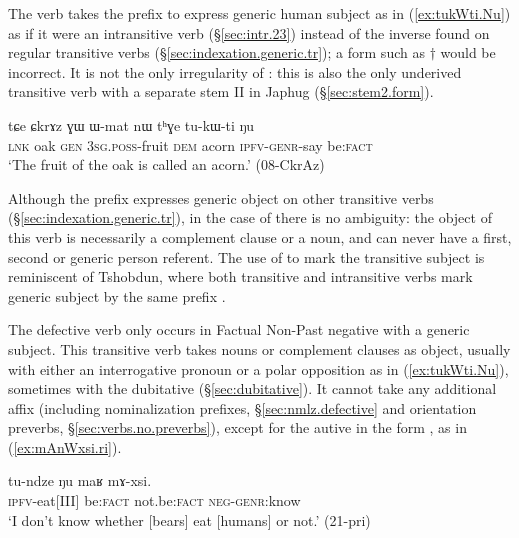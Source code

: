 The verb  takes the prefix  to express generic human subject as in (\ref{ex:tukWti.Nu}) as if it were an intransitive verb (§\ref{sec:intr.23}) instead of the inverse  found on regular transitive verbs (§\ref{sec:indexation.generic.tr}); a form such as $\dagger$ would be incorrect. It is not the only irregularity of  : this is also the only underived transitive verb with a separate stem II in Japhug (§\ref{sec:stem2.form}).


\begin{exe}
\ex   \label{ex:tukWti.Nu}
 \gll   tɕe ɕkrɤz ɣɯ ɯ-mat nɯ tʰɣe tu-kɯ-ti ŋu \\
 \textsc{lnk} oak \textsc{gen} \textsc{3sg}.\textsc{poss}-fruit \textsc{dem} acorn \textsc{ipfv}-\textsc{genr}-say be:\textsc{fact} \\
 \glt `The fruit of the oak is called an acorn.' (08-CkrAz)
\end{exe}

Although the prefix  expresses generic object on other transitive verbs (§\ref{sec:indexation.generic.tr}), in the case of  there is no ambiguity: the object of this verb is necessarily a complement clause or a noun, and can never have a first, second or generic person referent.  The use of  to mark the transitive subject is reminiscent of Tshobdun, where both transitive and intransitive verbs mark generic subject by the same prefix \citep{sun14generic}. 

The defective verb  only occurs in Factual Non-Past negative with a generic subject. This transitive verb takes nouns or complement clauses as object, usually with either an interrogative pronoun or a polar opposition as in (\ref{ex:tukWti.Nu}), sometimes with the dubitative (§\ref{sec:dubitative}). It cannot take any additional affix (including nominalization prefixes, §\ref{sec:nmlz.defective} and orientation preverbs, §\ref{sec:verbs.no.preverbs}), except for the autive  in the form , as in (\ref{ex:mAnWxsi.ri}). 

\begin{exe}
\ex   \label{ex:Nu.maR.mAxsi}
 \gll  tu-ndze ŋu maʁ mɤ-xsi. \\
 \textsc{ipfv}-eat[III] be:\textsc{fact} not.be:\textsc{fact} \textsc{neg}-\textsc{genr}:know \\
 \glt `I don't know whether [bears] eat [humans] or not.' (21-pri) 
\end{exe}

